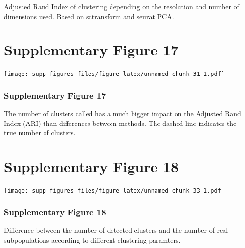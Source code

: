 \documentclass[]{article}
\begin{document}
Adjusted Rand Index of clustering depending on the resolution and number
of dimensions used. Based on sctransform and seurat PCA.

\hypertarget{supplementary-figure-17}{%
\section{Supplementary Figure 17}\label{supplementary-figure-17}}

\texttt{[image: supp\_figures\_files/figure-latex/unnamed-chunk-31-1.pdf]}

\hypertarget{supplementary-figure-17-1}{%
\subsubsection{Supplementary Figure
17}\label{supplementary-figure-17-1}}

The number of clusters called has a much bigger impact on the Adjusted
Rand Index (ARI) than differences between methods. The dashed line
indicates the true number of clusters.

\hypertarget{supplementary-figure-18}{%
\section{Supplementary Figure 18}\label{supplementary-figure-18}}

\texttt{[image: supp\_figures\_files/figure-latex/unnamed-chunk-33-1.pdf]}

\hypertarget{supplementary-figure-18-1}{%
\subsubsection{Supplementary Figure
18}\label{supplementary-figure-18-1}}

Difference between the number of detected clusters and the number of
real subpopulations according to different clustering paramters.

\newpage


\end{document}
